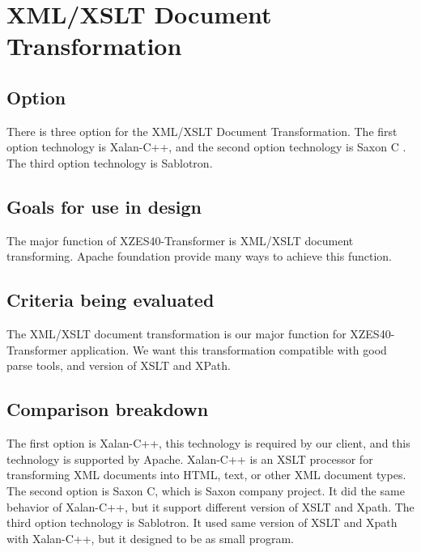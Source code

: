 \section{XML/XSLT Document Transformation}

\subsection{Option}
There is three option for the XML/XSLT Document Transformation.
The first option technology is Xalan-C++, and the second option technology is Saxon C . The third option technology is Sablotron.

\subsection{Goals for use in design}
The major function of XZES40-Transformer is XML/XSLT document transforming. Apache foundation provide many ways to achieve this function.

\subsection{Criteria being evaluated}
The XML/XSLT document transformation is our major function for XZES40-Transformer application.
We want this transformation compatible with good parse tools, and version of XSLT and XPath.

\subsection{Comparison breakdown}
The first option is Xalan-C++, this technology is required by our client, and this technology is supported by Apache. Xalan-C++ is an XSLT processor for transforming XML documents into HTML, text, or other XML document types. The second option is Saxon C, which is Saxon company project. It did the same behavior of Xalan-C++, but it support different version of XSLT and Xpath. The third option technology is Sablotron. It used same version of XSLT and Xpath with Xalan-C++, but it designed to be as small program.

